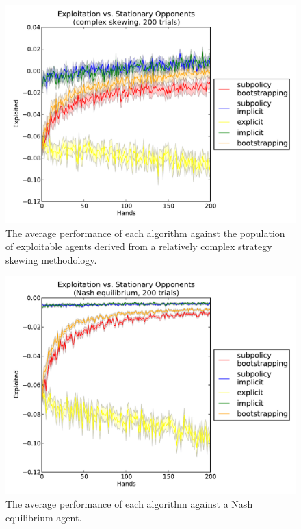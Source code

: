 \documentclass{aamas2013}
\begin{document}
\begin{figure}[tbh]
\centering
  \includegraphics[scale=.4]{exploited_complex_confidence.pdf}
\caption{The average performance of each algorithm against the population of exploitable agents derived from a relatively complex strategy skewing methodology.}
\label{fig-exploitedcomplex-confidence}
\end{figure}

\begin{figure}[tbh]
\centering
  \includegraphics[scale=.4]{exploited_nash_confidence.pdf}
\caption{The average performance of each algorithm against a Nash equilibrium agent.}
\label{fig-exploitednash-confidence}
\end{figure}

\end{document}
